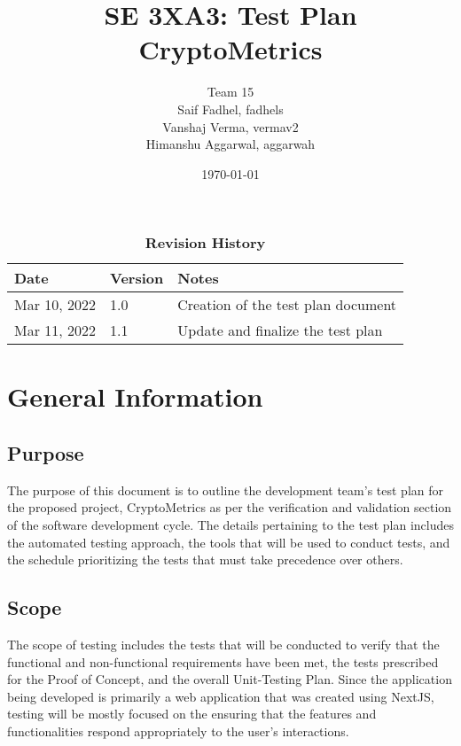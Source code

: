 \documentclass[12pt, titlepage]{article}
\title{SE 3XA3: Test Plan\\CryptoMetrics}
\author{Team 15
		\\ Saif Fadhel, fadhels
		\\ Vanshaj Verma, vermav2
		\\ Himanshu Aggarwal, aggarwah
}
\date{\today}
\begin{document}
\maketitle

\tableofcontents
\listoftables
\listoffigures

\begin{table}[bp]
\caption{\bf Revision History}
\begin{tabularx}{\textwidth}{p{3cm}p{2cm}X}
\toprule {\bf Date} & {\bf Version} & {\bf Notes}\\
\midrule
Mar 10, 2022 & 1.0 & Creation of the test plan document \\
Mar 11, 2022 & 1.1 & Update and finalize the test plan \\
\bottomrule
\end{tabularx}
\end{table}

\newpage


\section{General Information}

\subsection{Purpose}

The purpose of this document is to outline the development team's test plan for the proposed project, CryptoMetrics as per the verification and validation section of the software development cycle. The details pertaining to the test plan includes the automated testing approach, the tools that will be used to conduct tests, and the schedule prioritizing the tests that must take precedence over others.

\subsection{Scope}

The scope of testing includes the tests that will be conducted to verify that the functional and non-functional requirements have been met, the tests prescribed for the Proof of Concept, and the overall Unit-Testing Plan. Since the application being developed is primarily a web application that was created using NextJS, testing will be mostly focused on the ensuring that the features and functionalities respond appropriately to the user's interactions.
\end{document}
